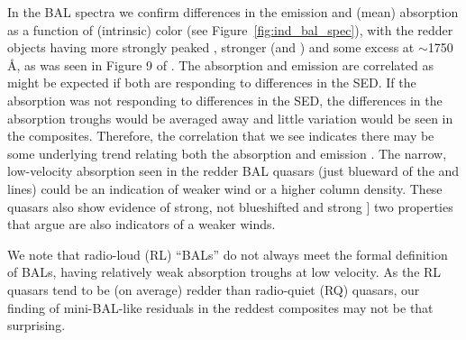 
In the BAL spectra we confirm differences in the emission and (mean) absorption as a function of (intrinsic) color (see Figure~\ref{fig:ind_bal_spec}), with the redder objects having more strongly peaked , stronger  (and ) and some excess at $\sim$1750\,\AA, as was seen in Figure 9 of \citet{Reichard:2003b}. The absorption and emission are correlated as might be expected if both are responding to differences in the SED.  If the absorption was not responding to differences in the SED, the differences in the absorption troughs would be averaged away and little variation would be seen in the composites. Therefore, the correlation that we see indicates there may be some underlying trend relating both the absorption and emission \citep[e.g.,][]{Turnshek:1988}.  The narrow, low-velocity absorption seen in the redder BAL quasars (just blueward of the  and  lines) could be an indication of weaker wind or a higher column density.  These quasars also show evidence of strong, not blueshifted  and strong ] two properties that \citet{Richards:2011} argue are also indicators of a weaker winds.

We note that radio-loud (RL) ``BALs'' \citet[e.g.,][]{Becker:2000} do not always meet the formal definition of BALs, having relatively weak absorption troughs at low velocity. As the RL quasars tend to be (on average) redder than radio-quiet (RQ) quasars, our finding of mini-BAL-like residuals in the reddest composites may not be that surprising. 

